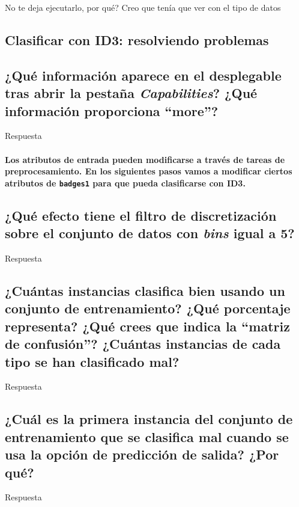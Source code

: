 \documentclass[12pt]{article}
\begin{document}
No te deja ejecutarlo, por qué? Creo que tenía que ver con el tipo de datos

\newpage

\begin{center}
\section{Clasificar con ID3: resolviendo problemas}
\end{center}

\subsection{\small ¿Qué información aparece en el desplegable tras abrir la
pestaña \emph{Capabilities}? ¿Qué información proporciona ``more''?}

Respuesta

\paragraph{\small Los atributos de entrada pueden modificarse a través de
tareas de preprocesamiento. En los siguientes pasos vamos a modificar ciertos
atributos de \texttt{badges1} para que pueda clasificarse con ID3.}

\subsection{\small ¿Qué efecto tiene el filtro de discretización sobre el
conjunto de datos con \emph{bins} igual a 5?}

Respuesta

\subsection{\small ¿Cuántas instancias clasifica bien usando un conjunto de
entrenamiento? ¿Qué porcentaje representa? ¿Qué crees que indica la ``matriz de
confusión''? ¿Cuántas instancias de cada tipo se han clasificado mal?}

Respuesta

\subsection{\small ¿Cuál es la primera instancia del conjunto de entrenamiento
que se clasifica mal cuando se usa la opción de predicción de salida? ¿Por qué?}

Respuesta
\end{document}
